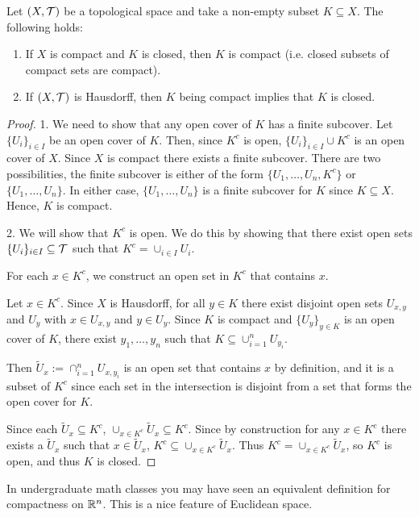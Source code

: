 \documentclass{article}
\begin{document}
\begin{proposition}
Let $(X,\mathcal{T})$ be a topological space and take a non-empty subset $K\subseteq X$. The following holds:
\begin{enumerate}
    \item If $X$ is compact and $K$ is closed, then $K$ is compact (i.e. closed subsets of compact sets are compact).
    \item If $(X,\mathcal{T})$ is Hausdorff, then $K$ being compact implies that $K$ is closed.
\end{enumerate}
\end{proposition}
\begin{proof}
1. We need to show that any open cover of $K$ has a finite subcover. Let $\{U_i\}_{i\in I}$ be an open cover of $K$. Then, since $K^c$ is open, $\{U_i\}_{i\in I} \cup {K^c}$ is an open cover of $X$. Since $X$ is compact there exists a finite subcover. There are two possibilities,  the finite subcover is either of the form $\{U_1, \ldots, U_n, K^c\}$ or $\{U_1, \ldots, U_n\}$. In either case, $\{U_1, \ldots, U_n\}$ is a finite subcover for $K$ since $K \subseteq X$. Hence, $K$ is compact. 
    
2. We will show that $K^c$ is open. We do this by showing that there exist open sets $\{U_i\}_{i \in I} \subseteq \mathcal{T}$ such that $K^c = \cup_{i \in I}  U_i$. 

For each $x\in K^c$, we construct an open set in $K^c$ that contains $x$.

Let $x\in K^c$. Since $X$ is Hausdorff, for all $y\in K$ there exist disjoint open sets $U_{x,y}$ and $U_y$ with $x\in U_{x,y}$ and  $y\in U_y$. Since $K$ is compact and $\{U_y\}_{y\in K}$ is an open cover of $K$, there exist $y_1,\ldots, y_n$ such that $K\subseteq \cup_{i=1}^n U_{y_i}$.

Then $\tilde U_x := \cap_{i=1}^n U_{x,y_i}$ is an open set that contains $x$ by definition, and it is a subset of $K^c$ since each set in the intersection is disjoint from a set that forms the open cover for $K$.

Since each $\tilde U_x \subseteq K^c$, $\cup_{x \in K^c} \tilde U_x \subseteq K^c$. Since by construction for any $x \in K^c$ there exists a $\tilde U_x$ such that $x \in \tilde U_x$, $K^c \subseteq \cup_{x \in K^c} \tilde U_x$. Thus $K^c = \cup_{x \in K^c} \tilde U_x$, so $K^c$ is open, and thus $K$ is closed.
\end{proof}

In undergraduate math classes you may have seen an equivalent definition for compactness on ${\mathbb{R}}^n$. This is a nice feature of Euclidean space.
\end{document}
